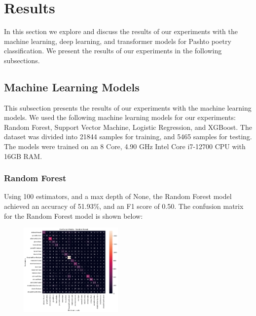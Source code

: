 \section{Results}

In this section we explore and discuss the results of our experiments with the machine learning, deep learning, and transformer models for Pashto poetry classification. We present the results of our experiments in the following subsections. 

\subsection{Machine Learning Models}

This subsection presents the results of our experiments with the machine learning models. We used the following machine learning models for our experiments: Random Forest, Support Vector Machine, Logistic Regression, and XGBoost. The dataset was divided into 21844 samples for training, and 5465 samples for testing. The models were trained on an 8 Core, 4.90 GHz Intel Core i7-12700 CPU with 16GB RAM. 

\subsubsection{Random Forest}
Using 100 estimators, and a max depth of None, the Random Forest model achieved an accuracy of 51.93\%, and an F1 score of 0.50. The confusion matrix for the Random Forest model is shown below:
\begin{figure}[H]
    \centering
    \includegraphics[width=0.45\textwidth]{rf_confmat.png}
\end{figure}

